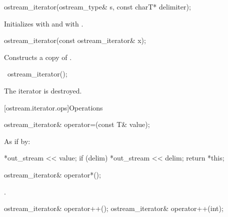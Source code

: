 %
\begin{itemdecl}
ostream_iterator(ostream_type& s, const charT* delimiter);
\end{itemdecl}

\begin{itemdescr}
\pnum
\effects
Initializes  with  and
 with .
\end{itemdescr}


%
\begin{itemdecl}
ostream_iterator(const ostream_iterator& x);
\end{itemdecl}

\begin{itemdescr}
\pnum
\effects
Constructs a copy of .
\end{itemdescr}

%
\begin{itemdecl}
~ostream_iterator();
\end{itemdecl}

\begin{itemdescr}
\pnum
\effects
The iterator is destroyed.
\end{itemdescr}

[ostream.iterator.ops]{Operations}

%
\begin{itemdecl}
ostream_iterator& operator=(const T& value);
\end{itemdecl}

\begin{itemdescr}
\pnum
\effects
As if by:
\begin{codeblock}
*out_stream << value;
if (delim)
  *out_stream << delim;
return *this;
\end{codeblock}
\end{itemdescr}

%
\begin{itemdecl}
ostream_iterator& operator*();
\end{itemdecl}

\begin{itemdescr}
\pnum
\returns
{}.
\end{itemdescr}

%
\begin{itemdecl}
ostream_iterator& operator++();
ostream_iterator& operator++(int);
\end{itemdecl}

